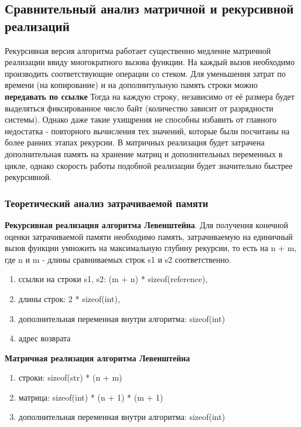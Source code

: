 \documentclass[12pt,a4paper]{article}
\begin{document}
\subsection{Сравнительный анализ матричной и рекурсивной реализаций}
Рекурсивная версия алгоритма работает существенно медленне матричной реализации ввиду многократного вызова функции. На каждый вызов необходимо производить соответствующие операции со стеком. Для уменьшения затрат по времени (на копирование) и на дополнитульную память строки можно \textbf{передавать по ссылке} Тогда на каждую строку, независимо от её размера будет выделяться фиксированное число байт (количество зависит от разрядности системы). Однако даже такие ухищрения не способны избавить от главного недостатка - повторного вычисления тех значений, которые были посчитаны на более ранних этапах рекурсии.
В матричных реализация будет затрачена дополнительная память на хранение матриц и дополнительных переменных в цикле, однако скорость работы подобной реализации будет значительно быстрее рекурсивной.
\subsubsection{Теоретический анализ затрачиваемой памяти}
\textbf{Рекурсивная реализация алгоритма Левенштейна}. Для получения конечной оценки затрачиваемой памяти необходимо память, затрачиваемую на единичный вызов функции умножить на максимальную глубину рекурсии, то есть на n + m, где n и m - длины сравниваемых строк s1 и s2 соответственно.
\begin{enumerate}
	\item ссылки на строки s1, s2: (m + n) * sizeof(reference),
	\item длины строк: 2 * sizeof(int),
	\item дополнительная переменная внутри алгоритма: sizeof(int)
	\item адрес возврата
\end{enumerate}

\textbf{Матричная реализация алгоритма Левенштейна}
\begin{enumerate}
	\item строки: sizeof(str) * (n + m)
	\item матрица: sizeof(int) * (n + 1) * (m + 1)
	\item дополнительная переменная внутри алгоритма: sizeof(int)
\end{enumerate}
\end{document}
